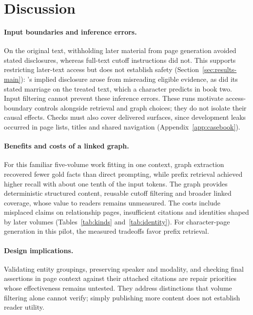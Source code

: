 \section{Discussion}
\label{sec:discussion}

\paragraph{Input boundaries and inference errors.}
On the original text, withholding later material from page generation avoided stated
disclosures, whereas full-text cutoff instructions did not. This supports restricting
later-text access but does not establish safety (Section~\ref{sec:results-main}):
\sys's implied disclosure arose from
misreading eligible evidence\ifnwdecon{}, as did its stated marriage on the treated text,
which a character predicts in book two\fi{}. Input filtering cannot prevent these inference
errors. These runs motivate access-boundary controls alongside retrieval and graph choices;
they do not isolate their causal effects. Checks must also cover delivered surfaces, since
development leaks occurred in page lists, titles and shared navigation
(Appendix~\ref{app:casebook}).

\paragraph{Benefits and costs of a linked graph.}
For this familiar five-volume work fitting in one context, graph extraction recovered fewer
gold facts than direct prompting, while prefix retrieval achieved higher recall with about
one tenth of the input tokens. The graph provides deterministic structured content, reusable
cutoff filtering and broader linked coverage, whose value to readers remains unmeasured.
The costs include misplaced claims on relationship pages, insufficient citations and
identities shaped by later volumes (Tables~\ref{tab:kinds} and~\ref{tab:identity}).
For character-page generation in this pilot, the measured tradeoffs favor prefix retrieval.

\paragraph{Design implications.}
Validating entity groupings, preserving speaker and modality, and checking final assertions
in page context against their attached citations are repair priorities whose effectiveness
remains untested. They address distinctions that volume filtering alone cannot verify;
simply publishing more content does not establish reader utility.
